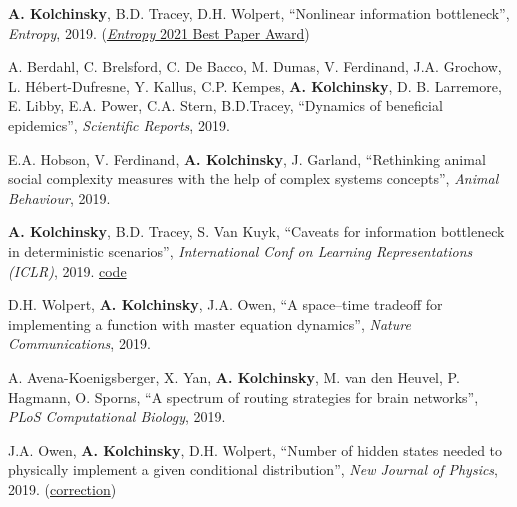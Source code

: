 \textbf{A. Kolchinsky}, B.D. Tracey, D.H. Wolpert, ``Nonlinear information bottleneck'', \emph{Entropy}, 2019.
 (\href{https://www.mdpi.com/journal/entropy/awards/1209}{{\emph{Entropy} 2021 Best Paper Award}})  

A. Berdahl, C. Brelsford, C. De Bacco, M. Dumas, V. Ferdinand, J.A. Grochow, L. Hébert-Dufresne,
Y. Kallus, C.P. Kempes, \textbf{A. Kolchinsky}, D. B. Larremore,
E. Libby, E.A. Power, C.A. Stern, B.D.Tracey, ``Dynamics of beneficial epidemics'', \emph{Scientific Reports}, 2019. 
 

E.A. Hobson, V. Ferdinand, \textbf{A. Kolchinsky}, J. Garland, 
``Rethinking animal social complexity measures with the help of complex systems concepts'', 
\emph{Animal Behaviour}, 2019. 
 

\textbf{A. Kolchinsky}, B.D. Tracey, S. Van Kuyk, ``Caveats for information bottleneck in deterministic scenarios'', \emph{International Conf on Learning Representations (ICLR)}, 2019. 
\href{https://github.com/artemyk/ibcurve}{code} 

D.H. Wolpert, \textbf{A. Kolchinsky}, J.A. Owen, ``A space–time tradeoff for implementing a function with master equation dynamics'', \emph{Nature Communications}, 2019. 
 

A. Avena-Koenigsberger, X. Yan, \textbf{A. Kolchinsky}, M. van den Heuvel, P. Hagmann, O. Sporns, 
``A spectrum of routing strategies for brain networks'', \emph{PLoS Computational Biology}, 2019. 
 

J.A. Owen, \textbf{A. Kolchinsky}, D.H. Wolpert, ``Number of hidden states needed to physically implement a given conditional distribution'', \emph{New Journal of Physics}, 2019. (\href{https://iopscience.iop.org/article/10.1088/1367-2630/ab60f8}{correction}) 
 

